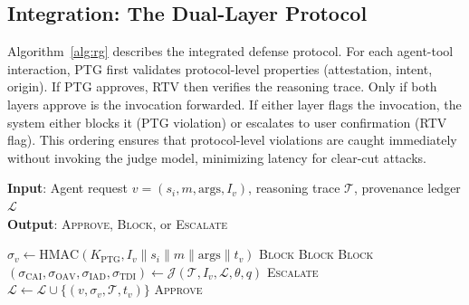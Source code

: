\subsection{Integration: The Dual-Layer Protocol}

Algorithm~\ref{alg:rg} describes the integrated defense protocol. For each agent-tool interaction, PTG first validates protocol-level properties (attestation, intent, origin). If PTG approves, RTV then verifies the reasoning trace. Only if both layers approve is the invocation forwarded. If either layer flags the invocation, the system either blocks it (PTG violation) or escalates to user confirmation (RTV flag). This ordering ensures that protocol-level violations are caught immediately without invoking the judge model, minimizing latency for clear-cut attacks.

\begin{algorithm}[tb]
\caption{\textsc{ReasoningGuard} Dual-Layer Verification}
\label{alg:rg}
\textbf{Input}: Agent request $v = (s_i, m, \text{args}, I_v)$, reasoning trace $\mathcal{T}$, provenance ledger $\mathcal{L}$\\
\textbf{Output}: \textsc{Approve}, \textsc{Block}, or \textsc{Escalate}
\begin{algorithmic}[1]
\STATE $\sigma_v \leftarrow \text{HMAC}(K_{\text{PTG}}, I_v \| s_i \| m \| \text{args} \| t_v)$
    \RETURN \textsc{Block}
\ENDIF
{}
    \RETURN \textsc{Block}
\ENDIF
{}
    \RETURN \textsc{Block}
\ENDIF
\STATE $(\sigma_{\text{CAI}}, \sigma_{\text{OAV}}, \sigma_{\text{IAD}}, \sigma_{\text{TDI}}) \leftarrow \mathcal{J}(\mathcal{T}, I_v, \mathcal{L}, \theta, q)$
    \RETURN \textsc{Escalate}
\ENDIF
\STATE $\mathcal{L} \leftarrow \mathcal{L} \cup \{(v, \sigma_v, \mathcal{T}, t_v)\}$
\RETURN \textsc{Approve}
\end{algorithmic}
\end{algorithm}
